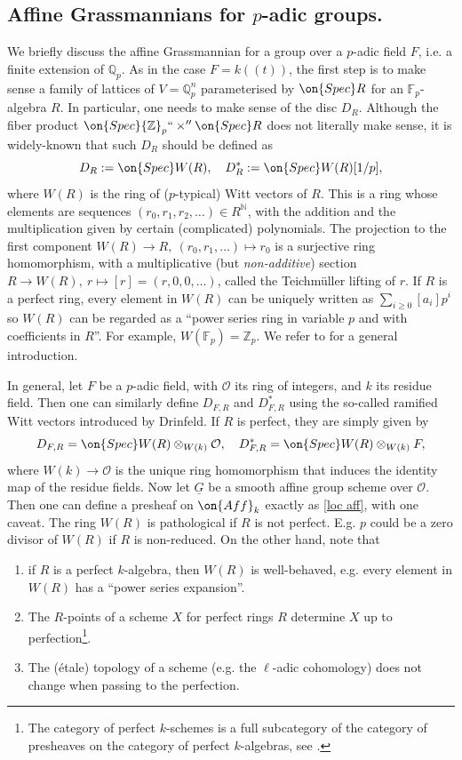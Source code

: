 \documentclass[]{pcmi}
\theoremstyle{plain}
\theoremstyle{remark}
\theoremstyle{definition}
\newcommand{\bF}{{\mathbb F}}
\newcommand{\bN}{{\mathbb N}}
\newcommand{\bQ}{{\mathbb Q}}
\newcommand{\bZ}{{\mathbb Z}}
\newcommand{\mO}{{\mathcal O}}
\newcommand{\Spec}{\on{Spec}}
\begin{document}
\subsection{Affine Grassmannians for $p$-adic groups.}\label{p-adic}
We briefly discuss the affine Grassmannian for a group over a $p$-adic field $F$, i.e. a finite extension of $\bQ_p$. 
 As in the case $F=k((t))$, the first step is to make sense a family of lattices of $V=\bQ_p^n$ parameterised by $\Spec R$ for an $\bF_p$-algebra $R$. In particular, one needs to make sense of the disc $D_R$. Although the fiber product $\Spec \bZ_p``\times''\Spec R$ does not literally make sense, it is widely-known that such $D_R$ should be defined as 
$$D_R:=\Spec W(R),\quad D^*_R:=\Spec W(R)[1/p],$$ 
where $W(R)$ is the ring of ($p$-typical) Witt vectors of $R$. This is a ring whose elements are sequences $(r_0,r_1,r_2,\ldots)\in R^{\bN}$, with the addition and the multiplication given by certain (complicated) polynomials. The projection to the first component $W(R)\to R, \ (r_0,r_1,\ldots)\mapsto r_0$ is a surjective ring homomorphism, with a multiplicative (but \emph{non-additive}) section $R\to W(R), \ r\mapsto [r]=(r,0,0,\ldots)$, called the Teichm\"uller lifting of $r$. If $R$ is a perfect ring, every element in $W(R)$ can be uniquely written as $\sum_{i\geq 0} [a_i]p^i$ so $W(R)$ can be regarded as a ``power series ring in variable $p$ and with coefficients in $R$''.
For example, $W(\bF_p)=\bZ_p$.  We refer to \cite[\S\ II.5]{Se2} for a general introduction.

In general, let $F$ be a $p$-adic field, with $\mO$ its ring of integers, and $k$ its residue field. Then one can similarly define $D_{F,R}$ and $D^*_{F,R}$ using the so-called ramified Witt vectors introduced by Drinfeld. If $R$ is perfect, they are simply given by
\[D_{F,R}= \Spec W(R)\otimes_{W(k)}\mO,\quad D^*_{F,R}= \Spec W(R)\otimes_{W(k)}F,\]
where $W(k)\to \mO$ is the unique ring homomorphism that induces the identity map of the residue fields.
Now let $\underline G$ be a smooth affine group scheme over $\mO$. Then one can define a presheaf on $\on{Aff}_k$ exactly as \eqref{loc aff}, with one caveat. The ring $W(R)$ is pathological if $R$ is not perfect. E.g. $p$ could be a zero divisor of $W(R)$ if $R$ is non-reduced. On the other hand, note that
\begin{enumerate}
\item if $R$ is a perfect $k$-algebra, then $W(R)$ is well-behaved, e.g. every element in $W(R)$ has a ``power series expansion''.
\item The $R$-points of a scheme $X$ for perfect rings $R$ determine $X$ up to perfection\footnote{The category of perfect $k$-schemes is a full subcategory of the category of presheaves on the category of perfect $k$-algebras, see \cite[Lemma A.10]{Z14}.}. 
\item The (\'{e}tale) topology of a scheme (e.g. the $\ell$-adic cohomology) does not change when passing to the perfection.
\end{enumerate}
\end{document}
